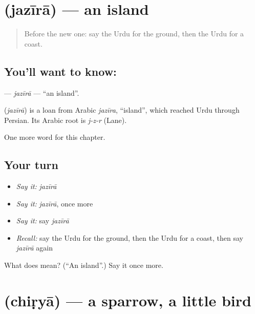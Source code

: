 \section[\texorpdfstring{\ur{جزیرہ} (jazīrā)}{جزیرہ (jazīrā)}]{ (jazīrā) — an island}

\label{lesson:UR-C125-jazira}



\begin{quote}
Before the new one: say the Urdu for the ground, then the Urdu for a coast.
\end{quote}

\subsection*{You'll want to know: }
\textbf{} — \emph{jazīrā} — \textquotedblleft{}an island\textquotedblright{}.

\begin{cousinweb}
\textbf{} (\emph{jazīrā}) is a loan from Arabic \emph{jazīra}, \textquotedblleft{}island\textquotedblright{}, which reached Urdu through Persian. Its Arabic root is \emph{j-z-r} (Lane).
\end{cousinweb}

\begin{grammarlens}[title={What you've built}]
One more word for this chapter.
\end{grammarlens}

\subsection*{Your turn}
\begin{itemize}
\raggedright
  \item \emph{Say it:} \emph{jazīrā}
  \item \emph{Say it:} \emph{jazīrā}, once more
  \item \emph{Say it:} say \emph{jazīrā}
  \item \emph{Recall:} say the Urdu for the ground, then the Urdu for a coast, then say \emph{jazīrā} again
\end{itemize}

\begin{tcolorbox}[breakable,colback=teal!4,colframe=teal!35!black,title={Before you move on}]
What does  mean? (\textquotedblleft{}An island\textquotedblright{}.) Say it once more.
\end{tcolorbox}
\section[\texorpdfstring{\ur{چڑیا} (chiṛyā)}{چڑیا (chiṛyā)}]{ (chiṛyā) — a sparrow, a little bird}

